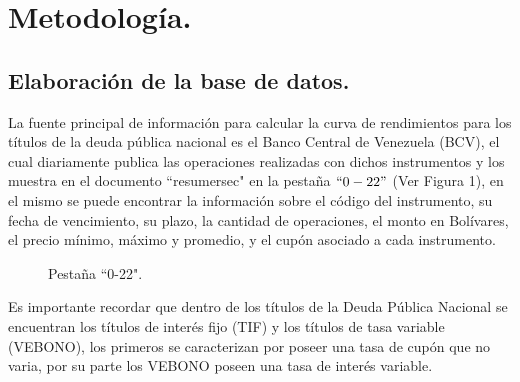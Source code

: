 \chapter{Metodolog\'ia.}

\section{Elaboraci\'on de la base de datos.}


\hspace{0.4cm} La fuente principal de informaci\'on para calcular la curva de rendimientos para los t\'itulos de la deuda p\'ublica nacional es el Banco Central de Venezuela (BCV), el cual diariamente publica las operaciones realizadas con dichos instrumentos y los muestra en el documento ``resumersec"\hspace{0.01cm} en la pesta\~na $``0-22"$ (Ver Figura 1), en el mismo se puede encontrar la informaci\'on sobre el c\'odigo del instrumento, su fecha de vencimiento, su plazo, la cantidad de operaciones, el monto en Bol\'ivares, el precio m\'inimo, m\'aximo y promedio, y el cup\'on asociado a cada instrumento.

\vspace{0.5cm}

\begin{figure}[h]
\caption{Pesta\~na ``0-22".}
\end{figure}

\vspace{0.5cm}

\hspace{0.4cm} Es importante recordar que dentro de los t\'itulos de la Deuda P\'ublica Nacional se encuentran los t\'itulos de inter\'es fijo (TIF) y los t\'itulos de tasa variable (VEBONO), los primeros se caracterizan por poseer una tasa de cup\'on que no varia, por su parte los VEBONO poseen una tasa de inter\'es variable.

